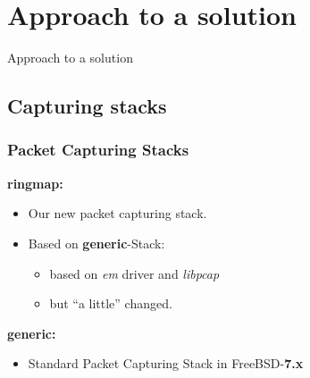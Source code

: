 \documentclass{beamer}
\begin{document}
\begin{frame}
\begin{columns}
\begin{figure}
\end{figure}
\end{columns}
\end{frame}



\section{Approach to a solution}

\begin{frame}
	\begin{center}
	\huge{Approach to a solution}
	\end{center}
\end{frame}


\subsection*{Capturing stacks}
\begin{frame}
\frametitle{Packet Capturing Stacks}
\textbf{ringmap:}
\begin{itemize}
	\item Our new packet capturing stack.
	\item Based on \textbf{generic}-Stack: 		
		\begin{itemize}
			\item based on \emph{em} driver and \emph{libpcap}
			\item but "`a little"' changed.\newline
		\end{itemize}
\end{itemize}
\textbf{generic:}
\begin{itemize}
	\item Standard Packet Capturing Stack in FreeBSD-\textbf{7.x}\newline \newline
\end{itemize}
\begin{center}
\end{center}
\end{frame}
\end{document}
